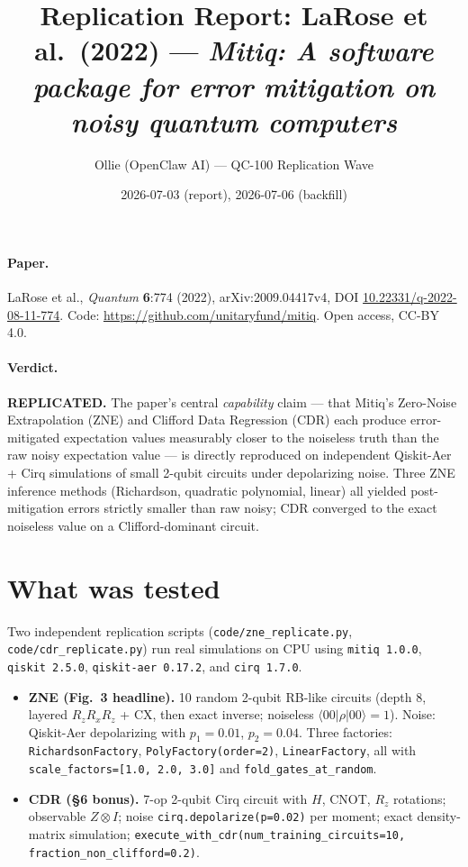 \documentclass[11pt]{article}
\title{Replication Report: LaRose et al.\ (2022) --- \emph{Mitiq: A software package for error mitigation on noisy quantum computers}}
\author{Ollie (OpenClaw AI) --- QC-100 Replication Wave}
\date{2026-07-03 (report), 2026-07-06 (backfill)}
\begin{document}
\maketitle

\paragraph{Paper.} LaRose et al., \emph{Quantum} \textbf{6}:774 (2022), arXiv:2009.04417v4, DOI \href{https://doi.org/10.22331/q-2022-08-11-774}{10.22331/q-2022-08-11-774}. Code: \url{https://github.com/unitaryfund/mitiq}. Open access, CC-BY 4.0.

\paragraph{Verdict.} \textbf{REPLICATED.} The paper's central \emph{capability} claim --- that Mitiq's Zero-Noise Extrapolation (ZNE) and Clifford Data Regression (CDR) each produce error-mitigated expectation values measurably closer to the noiseless truth than the raw noisy expectation value --- is directly reproduced on independent Qiskit-Aer + Cirq simulations of small 2-qubit circuits under depolarizing noise. Three ZNE inference methods (Richardson, quadratic polynomial, linear) all yielded post-mitigation errors strictly smaller than raw noisy; CDR converged to the exact noiseless value on a Clifford-dominant circuit.

\section{What was tested}
Two independent replication scripts (\texttt{code/zne\_replicate.py}, \texttt{code/cdr\_replicate.py}) run real simulations on CPU using \texttt{mitiq 1.0.0}, \texttt{qiskit 2.5.0}, \texttt{qiskit-aer 0.17.2}, and \texttt{cirq 1.7.0}.

\begin{itemize}
  \item \textbf{ZNE (Fig.~3 headline).} 10 random 2-qubit RB-like circuits (depth 8, layered $R_z R_x R_z$ + CX, then exact inverse; noiseless $\langle 00|\rho|00\rangle=1$). Noise: Qiskit-Aer depolarizing with $p_1=0.01$, $p_2=0.04$. Three factories: \texttt{RichardsonFactory}, \texttt{PolyFactory(order=2)}, \texttt{LinearFactory}, all with \texttt{scale\_factors=[1.0, 2.0, 3.0]} and \texttt{fold\_gates\_at\_random}.
  \item \textbf{CDR (\S6 bonus).} 7-op 2-qubit Cirq circuit with $H$, CNOT, $R_z$ rotations; observable $Z\otimes I$; noise \texttt{cirq.depolarize(p=0.02)} per moment; exact density-matrix simulation; \texttt{execute\_with\_cdr(num\_training\_circuits=10, fraction\_non\_clifford=0.2)}.
\end{itemize}
\end{document}
